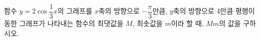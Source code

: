 함수 $y=2\cos\dfrac{1}{3}x$의 그래프를 $x$축의 방향으로 $-\dfrac{\pi}{3}$만큼, $y$축의 방향으로 4만큼 평행이동한 그래프가 나타내는 함수의 최댓값을 $M$, 최솟값을 $m$이라 할 때, $Mm$의 값을 구하시오.
